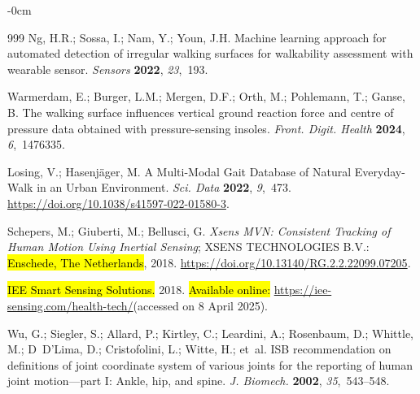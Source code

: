 \documentclass[sensors,article,accept,pdftex,moreauthors]{Definitions/mdpi}
\begin{document}
\begin{adjustwidth}{-\extralength}{0cm}
\begin{thebibliography}{999}
Ng, H.R.; Sossa, I.; Nam, Y.; Youn, J.H.
 Machine learning approach for automated detection of irregular
  walking surfaces for walkability assessment with wearable sensor.
 {\em Sensors} {\bf 2022}, {\em 23},~193.

Warmerdam, E.; Burger, L.M.; Mergen, D.F.; Orth, M.; Pohlemann, T.; Ganse, B.
 The walking surface influences vertical ground reaction force and
  centre of pressure data obtained with pressure-sensing insoles.
 {\em Front. Digit. Health} {\bf 2024}, {\em 6},~1476335.

Losing, V.; Hasenjäger, M.
 A {Multi}-{Modal} {Gait} {Database} of {Natural} {Everyday}-{Walk} in
  an {Urban} {Environment}.
 {\em Sci. Data} {\bf 2022}, {\em 9},~473.
 {\url{https://doi.org/10.1038/s41597-022-01580-3}}.

Schepers, M.; Giuberti, M.; Bellusci, G.
 \emph{Xsens MVN: Consistent Tracking of Human Motion Using Inertial
  Sensing};
 XSENS TECHNOLOGIES B.V.: \hl{Enschede, The Netherlands}, 2018.
 {\url{https://doi.org/10.13140/RG.2.2.22099.07205}}.

\hl{IEE Smart Sensing Solutions.} %
  2018. \hl{Available online: }%
{\url{https://iee-sensing.com/health-tech/}}(accessed on 8 April 2025).

Wu, G.; Siegler, S.; Allard, P.; Kirtley, C.; Leardini, A.; Rosenbaum, D.;
  Whittle, M.; D~D’Lima, D.; Cristofolini, L.; Witte, H.;  et~al.
 ISB recommendation on definitions of joint coordinate system of
  various joints for the reporting of human joint motion—part I: Ankle, hip,
  and spine.
 {\em J. Biomech.} {\bf 2002}, {\em 35},~543--548.


\end{thebibliography}
\end{adjustwidth}
\end{document}
